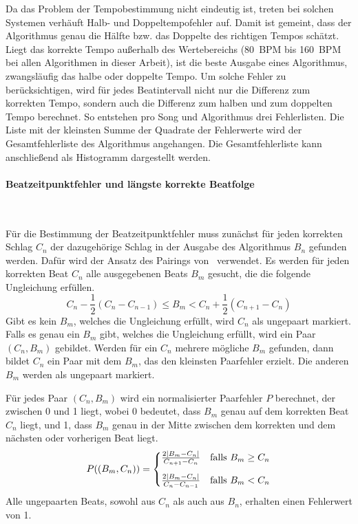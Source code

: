 {{{			%
			Da das Problem der Tempobestimmung nicht eindeutig ist,
				treten bei solchen Systemen verhäuft Halb- und Doppeltempofehler auf.
			Damit ist gemeint,
				dass der Algorithmus genau die Hälfte bzw. das Doppelte des richtigen Tempos schätzt.
			Liegt das korrekte Tempo au{\ss}erhalb des Wertebereichs
				(\SI{80}{\ac{BPM}} bis \SI{160}{\ac{BPM}} bei allen Algorithmen in dieser Arbeit),
				ist die beste Ausgabe eines Algorithmus,
				zwangsläufig das halbe oder doppelte Tempo.
			Um solche Fehler zu berücksichtigen,
				wird für jedes Beatintervall nicht nur die Differenz zum korrekten Tempo,
				sondern auch die Differenz zum halben und zum doppelten Tempo berechnet.
			So entstehen pro Song und Algorithmus drei Fehlerlisten.
			Die Liste mit der kleinsten Summe der Quadrate der Fehlerwerte wird der Gesamtfehlerliste des Algorithmus angehangen.
			Die Gesamtfehlerliste kann anschlie{\ss}end als Histogramm dargestellt werden.
		}

		\paragraph{\large Beatzeitpunktfehler und längste korrekte Beatfolge} \mbox{}\vspace{3mm}\\
		{
			Für die Bestimmung der Beatzeitpunktfehler muss zunächst
				für jeden korrekten Schlag $C_n$ der dazugehörige Schlag in der Ausgabe des Algorithmus $B_n$ gefunden werden.
			Dafür wird der Ansatz des Pairings von~\cite{1997_GoMu1} verwendet.
			Es werden für jeden korrekten Beat $C_n$ alle ausgegebenen Beats $B_m$ gesucht,
				die die folgende Ungleichung erfüllen.
			\begin{equation}
				C_n - \frac{1}{2}(C_n - C_{n - 1}) \le B_m < C_n + \frac{1}{2}(C_{n + 1} - C_n)
			\end{equation}
			Gibt es kein $B_m$,
				welches die Ungleichung erfüllt,
				wird $C_n$ als ungepaart markiert.
			Falls es genau ein $B_m$ gibt,
				welches die Ungleichung erfüllt,
				wird ein Paar $(C_n, B_m)$ gebildet.
			Werden für ein $C_n$ mehrere mögliche $B_m$ gefunden,
				dann bildet $C_n$ ein Paar mit dem $B_m$,
				das den kleinsten Paarfehler erzielt.
			Die anderen $B_m$ werden als ungepaart markiert.

			Für jedes Paar $(C_n, B_m)$ wird ein normalisierter Paarfehler $P$ berechnet,
				der zwischen \num{0} und \num{1} liegt,
				wobei \num{0} bedeutet,
				dass $B_m$ genau auf dem korrekten Beat $C_n$ liegt,
				und \num{1},
				dass $B_m$ genau in der Mitte zwischen dem korrekten und dem nächsten oder vorherigen Beat liegt.
			\begin{equation}
				P((B_m, C_n)) =
					\begin{cases}
						\frac{2|B_m - C_n|}{C_{n + 1} - C_n} & \text{falls } B_m \ge C_n \vspace{3mm} \\
						\frac{2|B_m - C_n|}{C_n - C_{n - 1}} & \text{falls } B_m  <  C_n
					\end{cases}
			\end{equation}
			Alle ungepaarten Beats,
				sowohl aus $C_n$ als auch aus $B_n$,
				erhalten einen Fehlerwert von \num{1}.

}}}
